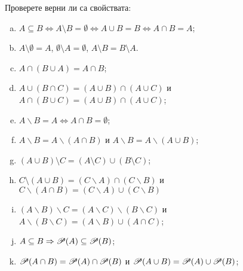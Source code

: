

\begin{problem}
  Проверете верни ли са свойствата:
  \begin{enumerate}[a)]
  \item
    $A\subseteq B \iff A\setminus B = \emptyset \iff A\cup B = B \iff A\cap B = A$;
  \item
    $A\setminus \emptyset = A$, $\emptyset\setminus A=\emptyset$, $A\setminus B = B\setminus A$.
  \item
    $A\cap (B\cup A) = A \cap B$;
  \item
    $A\cup(B\cap C) = (A\cup B)\cap(A\cup C)$ и $A \cap (B \cup C) = (A \cup B) \cap (A \cup C)$;
  \item
    $A\backslash B = A \iff A\cap B = \emptyset$;
  \item
    $A\backslash B = A\backslash (A\cap B)$ и $A\backslash B = A\backslash (A\cup B)$;
  \item
    $(A\cup B)\setminus C = (A\setminus C) \cup (B\setminus C)$;
  \item
    $C\setminus (A\cup B) = (C\backslash A)\cap(C\backslash B)$ и $C \backslash (A\cap B) = (C\backslash A)\cup(C\backslash B)$
  \item
    $(A\backslash B)\backslash C = (A\backslash C)\backslash(B \backslash C)$ и $A\backslash (B\backslash C) = (A\backslash B) \cup (A\cap C)$;
  \item
    $A\subseteq B \Rightarrow \mathscr{P}(A) \subseteq \mathscr{P}(B)$;
  \item
    $\mathscr{P}(A\cap B) = \mathscr{P}(A) \cap \mathscr{P}(B)$ и $\mathscr{P}(A\cup B) = \mathscr{P}(A) \cup \mathscr{P}(B)$;
  \end{enumerate}
\end{problem}

